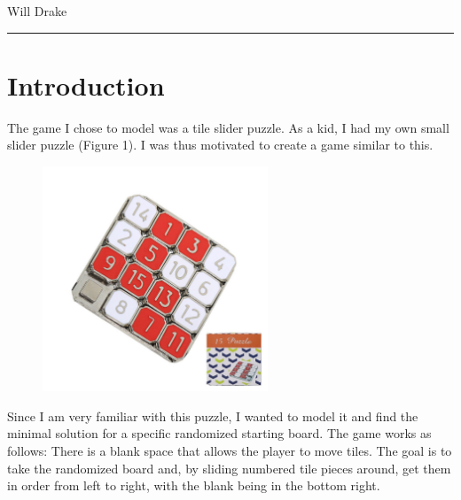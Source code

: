 \documentclass[12pt]{article}
\theoremstyle{definition} \newtheorem{prob}{Problem}
\theoremstyle{definition} \newtheorem{cprob}{Challenge Problem}
\theoremstyle{definition} \newtheorem{sol}{Solution}
\begin{document}


\begin{center}
  Will Drake
\end{center}

\begin{center}
  \rule{10cm}{0.1pt}
\end{center}

\section{Introduction}
The game I chose to model was a tile slider puzzle.
As a kid, I had my own small slider puzzle (Figure 1). I was thus motivated to create a game similar to this.

\begin{figure}[H]
  \centering
  \caption{}
  \includegraphics[width=0.6\textwidth]{download.jpg}
  \label{fig:slider-puzzle}
\end{figure}

Since I am very familiar with this puzzle, I wanted to model it and find the minimal solution for a specific randomized starting board. The game works as follows: There is a blank space that allows the player to move tiles. The goal is to take the randomized board and, by sliding numbered tile pieces around, get them in order from left to right, with the blank being in the bottom right.
\end{document}
